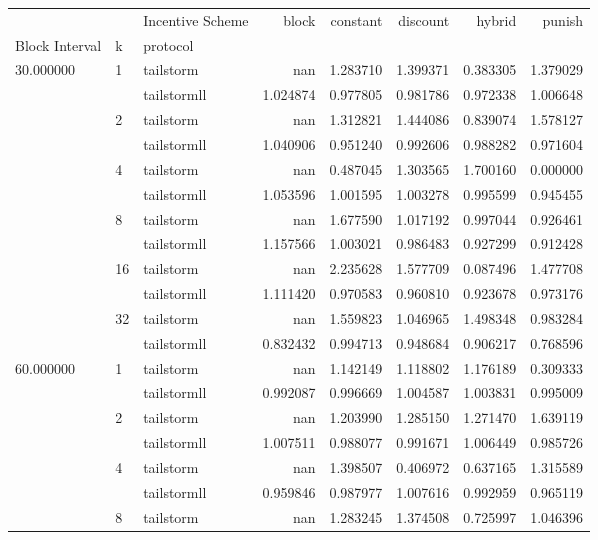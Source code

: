 \begin{tabular}{lllrrrrr}
 &  & Incentive Scheme & block & constant & discount & hybrid & punish \\
Block Interval & k & protocol &  &  &  &  &  \\
\multirow[c]{12}{*}{30.000000} & \multirow[c]{2}{*}{1} & tailstorm & nan & 1.283710 & 1.399371 & 0.383305 & 1.379029 \\
 &  & tailstormll & 1.024874 & 0.977805 & 0.981786 & 0.972338 & 1.006648 \\
 & \multirow[c]{2}{*}{2} & tailstorm & nan & 1.312821 & 1.444086 & 0.839074 & 1.578127 \\
 &  & tailstormll & 1.040906 & 0.951240 & 0.992606 & 0.988282 & 0.971604 \\
 & \multirow[c]{2}{*}{4} & tailstorm & nan & 0.487045 & 1.303565 & 1.700160 & 0.000000 \\
 &  & tailstormll & 1.053596 & 1.001595 & 1.003278 & 0.995599 & 0.945455 \\
 & \multirow[c]{2}{*}{8} & tailstorm & nan & 1.677590 & 1.017192 & 0.997044 & 0.926461 \\
 &  & tailstormll & 1.157566 & 1.003021 & 0.986483 & 0.927299 & 0.912428 \\
 & \multirow[c]{2}{*}{16} & tailstorm & nan & 2.235628 & 1.577709 & 0.087496 & 1.477708 \\
 &  & tailstormll & 1.111420 & 0.970583 & 0.960810 & 0.923678 & 0.973176 \\
 & \multirow[c]{2}{*}{32} & tailstorm & nan & 1.559823 & 1.046965 & 1.498348 & 0.983284 \\
 &  & tailstormll & 0.832432 & 0.994713 & 0.948684 & 0.906217 & 0.768596 \\
\multirow[c]{12}{*}{60.000000} & \multirow[c]{2}{*}{1} & tailstorm & nan & 1.142149 & 1.118802 & 1.176189 & 0.309333 \\
 &  & tailstormll & 0.992087 & 0.996669 & 1.004587 & 1.003831 & 0.995009 \\
 & \multirow[c]{2}{*}{2} & tailstorm & nan & 1.203990 & 1.285150 & 1.271470 & 1.639119 \\
 &  & tailstormll & 1.007511 & 0.988077 & 0.991671 & 1.006449 & 0.985726 \\
 & \multirow[c]{2}{*}{4} & tailstorm & nan & 1.398507 & 0.406972 & 0.637165 & 1.315589 \\
 &  & tailstormll & 0.959846 & 0.987977 & 1.007616 & 0.992959 & 0.965119 \\
 & \multirow[c]{2}{*}{8} & tailstorm & nan & 1.283245 & 1.374508 & 0.725997 & 1.046396 \\

\end{tabular}
